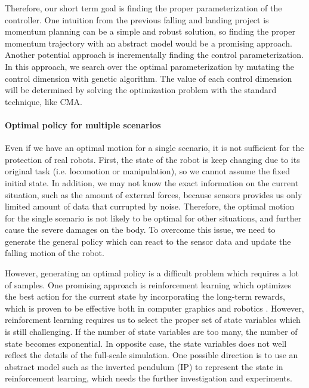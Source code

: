 Therefore, our short term goal is finding the proper parameterization
of the controller.
One intuition from the previous falling and landing project is
momentum planning can be a simple and robust solution, so finding the 
proper momentum trajectory with an abstract model would be 
a promising approach.
Another potential approach is incrementally finding the control 
parameterization. 
In this approach, we search over the optimal parameterization by 
mutating the control dimension with genetic algorithm.
The value of each control dimension will be determined by solving
the optimization problem with the standard technique, like CMA.


\paragraph{Optimal policy for multiple scenarios}

Even if we have an optimal motion for a single scenario,
it is not sufficient for the protection of real robots.
First, the state of the robot is keep changing due to its original
task (i.e. locomotion or manipulation), so we cannot assume
the fixed initial state.
In addition, we may not know the exact information on the current
situation, such as the amount of external forces, because sensors
provides us only limited amount of data that currupted by noise.
Therefore, the optimal motion for the single scenario is not likely 
to be optimal for other situations, and further cause the severe damages
on the body.
To overcome this issue, we need to generate the general policy which 
can react to the sensor data and update the falling motion of the robot.

However, generating an optimal policy is a difficult problem which
requires a lot of samples.
One promising approach is reinforcement learning which optimizes
the best action for the current state by incorporating the long-term
rewards, which is proven to be effective both in computer graphics
\cite{Coros:2009:RTC} and robotics \cite{Morimoto:2004:SRL}.
However, reinforcment learning requires us to select the proper set
of state variables which is still challenging.
If the number of state variables are too many, 
the number of state becomes exponential.
In opposite case, the state variables does not well reflect the 
details of the full-scale simulation.
One possible direction is to use an abstract model such as the 
inverted pendulum (IP) to represent the state in reinforcement learning,
which needs the further investigation and experiments.

